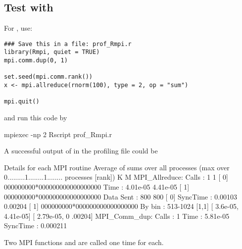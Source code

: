 \subsection{Test with }

For , use:
\begin{lstlisting}[title=Test script for pbdMPI]
### Save this in a file: prof_Rmpi.r
library(Rmpi, quiet = TRUE)
mpi.comm.dup(0, 1)

set.seed(mpi.comm.rank())
x <- mpi.allreduce(rnorm(100), type = 2, op = "sum")

mpi.quit()
\end{lstlisting}
and run this code by
\begin{Code}
mpiexec -np 2 Rscript prof_Rmpi.r
\end{Code}

A successful output of 
in the profiling file  could be
\begin{Output}
Details for each MPI routine
                  Average of sums over all processes
                                (max over          0.........1........1........
                                 processes [rank])           K        M
MPI_Allreduce:
        Calls     :          1            1 [   0] 000000000*000000000000000000
        Time      :   4.01e-05     4.41e-05 [   1] 000000000*000000000000000000
        Data Sent :        800          800 [   0]
        SyncTime  :    0.00103      0.00204 [   1] 000000000*000000000000000000
        By bin    : 513-1024    [1,1]   [   3.6e-05,  4.41e-05] [  2.79e-05,   0
.00204]
MPI_Comm_dup:     
        Calls     :          1
        Time      :   5.81e-05
        SyncTime  :   0.000211
\end{Output}
Two MPI  functions  and 
are called one time for each.

